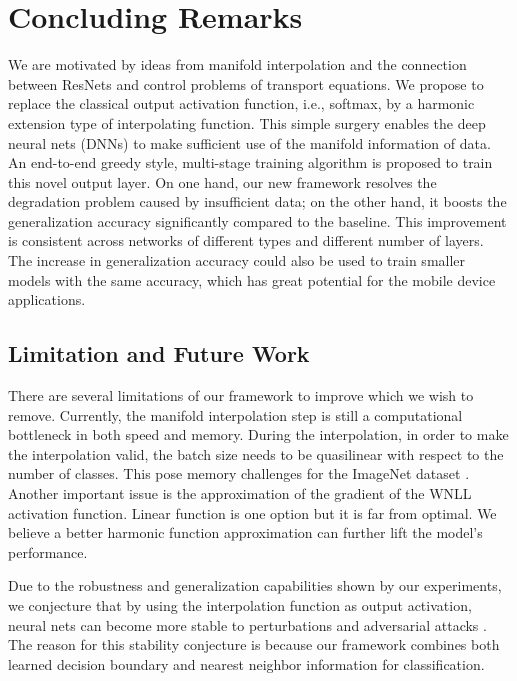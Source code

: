 \documentclass{article}
\begin{document}
\section{Concluding Remarks}
We are motivated by ideas from manifold interpolation and the connection between ResNets and control problems of transport equations. We propose to replace the classical output activation function, i.e., softmax, by a harmonic extension type of interpolating function. This simple surgery enables the deep neural nets (DNNs) to make sufficient use of the manifold information of data. An end-to-end greedy style, multi-stage training algorithm is proposed to train this novel output layer. On one hand, our new framework resolves the degradation problem caused by insufficient data; on the other hand, it boosts the generalization accuracy significantly compared to the baseline. This improvement is consistent across networks of different types and different number of layers. The increase in generalization accuracy could also be used to train smaller models with the same accuracy, which has great potential for the mobile device applications.

\subsection{Limitation and Future Work}
There are several limitations of our framework to improve which we wish to remove. Currently, the manifold interpolation step is still a computational bottleneck in both speed and memory. During the interpolation, in order to make the interpolation valid, the batch size needs to be quasilinear with respect to the number of classes. This pose memory challenges for the ImageNet dataset \cite{imagenet_cvpr09}. Another important issue is the approximation of the gradient of the WNLL activation function. Linear function is one option but it is far from optimal. We believe a better harmonic function approximation can further lift the model's performance.

Due to the robustness and generalization capabilities shown by our experiments, we conjecture that by using the interpolation function as output activation, neural nets can become more stable to perturbations and adversarial attacks \cite{Papernot:2015}. The reason for this stability conjecture is because our framework combines both learned decision boundary and nearest neighbor information for classification. 

\clearpage
\end{document}
